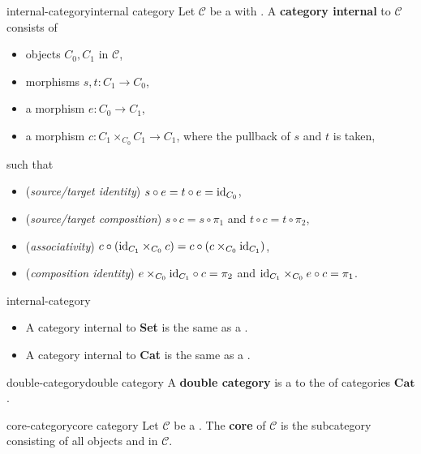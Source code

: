 \begin{topic}{internal-category}{internal category}
    Let $\mathcal{C}$ be a  with . A \textbf{category internal} to $\mathcal{C}$ consists of
    \begin{itemize}
        \item objects $C_0, C_1$ in $\mathcal{C}$,
        \item morphisms $s, t \colon C_1 \to C_0$,
        \item a morphism $e \colon C_0 \to C_1$,
        \item a morphism $c \colon C_1 \times_{C_0} C_1 \to C_1$, where the pullback of $s$ and $t$ is taken,
    \end{itemize}
    such that
    \begin{itemize}
        \item (\textit{source/target identity}) $s \circ e = t \circ e = \textup{id}_{C_0}$,
        \item (\textit{source/target composition}) $s \circ c = s \circ \pi_1$ and $t \circ c = t \circ \pi_2$,
        \item (\textit{associativity}) $c \circ (\textup{id}_{C_1} \times_{C_0} c) = c \circ (c \times_{C_0} \textup{id}_{C_1})$,
        \item (\textit{composition identity}) $e \times_{C_0} \textup{id}_{C_1} \circ c = \pi_2$ and $\textup{id}_{C_1} \times_{C_0} e \circ c = \pi_1$.
    \end{itemize}
\end{topic}

\begin{example}{internal-category}
    \begin{itemize}
        \item A category internal to \textbf{Set} is the same as a .
        \item A category internal to \textbf{Cat} is the same as a .
    \end{itemize}
\end{example}

\begin{topic}{double-category}{double category}
    A \textbf{double category} is a  to the  of categories  $\textbf{Cat}$.
\end{topic}

\begin{topic}{core-category}{core category}
    Let $\mathcal{C}$ be a . The \textbf{core} of $\mathcal{C}$ is the subcategory consisting of all objects and  in $\mathcal{C}$. 
\end{topic}

